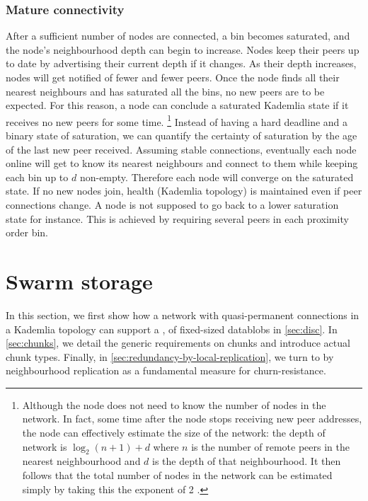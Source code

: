     


\subsubsection{Mature connectivity}

After a sufficient number of nodes are connected, a bin becomes saturated, and the node's neighbourhood depth can begin to increase. Nodes keep their peers up to date by advertising their current depth if it changes. As their depth increases, nodes will get notified of fewer and fewer peers. Once the node finds all their nearest neighbours and has saturated all the bins, no new peers are to be expected. For this reason, a node can conclude a saturated Kademlia state if it receives no new peers for some time.%
%
\footnote{Although the node does not need to know the number of nodes in the network. In fact, some time after the node stops receiving new peer addresses, the node can effectively estimate the size of the network: the depth of network is $\log_2(n+1)+ d$ where $n$ is the number of remote peers in the nearest neighbourhood and $d$ is the depth of that neighbourhood. It then  follows that the total number of nodes in the network can be estimated simply by taking this the exponent of 2 .}
%
Instead of having a hard deadline and a binary state of saturation, we can quantify the certainty of saturation by the age of the last new peer received. Assuming stable connections, eventually each node online will get to know its nearest neighbours and connect to them while keeping each bin up to $d$ non-empty. Therefore each node will converge on the saturated state. If no new nodes join, health (Kademlia topology) is maintained even if peer connections change. A node is not supposed to go back to a lower saturation state for instance. This is achieved by requiring several peers in each proximity order bin. 

\section{Swarm storage\statusgreen}\label{sec:kademlia-storage}

In this section, we first show how a network with quasi-permanent connections in a Kademlia topology can support a ,  of fixed-sized datablobs in \ref{sec:disc}. In \ref{sec:chunks}, we detail the generic requirements on chunks and introduce actual chunk types. Finally, in \ref{sec:redundancy-by-local-replication}, we turn to  by neighbourhood replication as a fundamental measure for churn-resistance.


